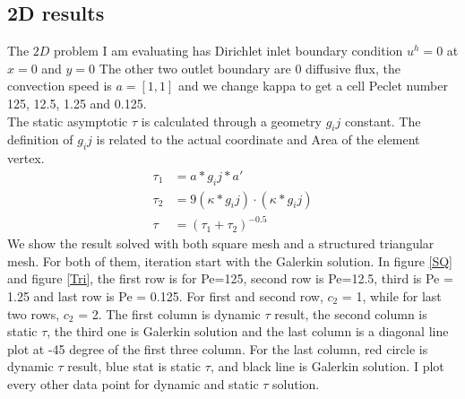 \documentclass[10pt]{article}
\begin{document}
\subsection{2D results}
The $2D$ problem I am evaluating has Dirichlet inlet boundary condition $u^{h} = 0$ at $x=0$ and $y=0$ The other two outlet boundary are 0 diffusive flux, the convection speed is $a = [1,1]$ and we change kappa to get a cell Peclet number 125, 12.5, 1.25 and 0.125.\\
The static asymptotic $\tau$ is calculated through a geometry $g_ij$ constant. The definition of $g_ij$ is related to the actual coordinate and Area of the element vertex.
\begin{equation}
    \begin{aligned}
       \tau_1  &= a*g_ij*a' \\
       \tau_2  &= 9(\kappa*g_ij)\cdot (\kappa*g_ij) \\
       \tau &=(\tau_1+\tau_2)^{-0.5}
    \end{aligned}\label{eq:2} 
\end{equation}
We show the result solved with both square mesh and a structured triangular mesh. For both of them, iteration start with the Galerkin solution. In figure \ref{SQ} and figure \ref{Tri}, the first row is for Pe=125, second row is Pe=12.5, third is Pe = 1.25 and last row is Pe = 0.125. For first and second row, $c_2$ = 1, while for last two rows, $c_2$ = 2. The first column is dynamic $\tau$ result, the second column is static $\tau$, the third one is Galerkin solution and the last column is a diagonal line plot at -45 degree of the first three column. For the last column, red circle is dynamic $\tau$ result, blue stat is static $\tau$, and black line is Galerkin solution. I plot every other data point for dynamic and static $\tau$ solution.
\end{document}
